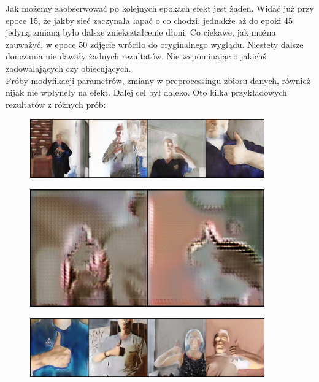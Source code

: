 \documentclass[12pt]{article}
\begin{document}
\begin{sloppypar}
{{\begin{figure}
    \end{figure}
    Jak możemy zaobserwować po kolejnych epokach efekt jest żaden. 
    Widać już przy epoce 15, że jakby sieć zaczynała łapać o co chodzi, jednakże aż do epoki 45 jedyną zmianą było dalsze zniekształcenie dłoni. 
    Co ciekawe, jak można zauważyć, w epoce 50 zdjęcie wróciło do oryginalnego wyglądu. 
    Niestety dalsze douczania nie dawały żadnych rezultatów. Nie wspominając o jakichś zadowalających czy obiecujących. \\
    Próby modyfikacji parametrów, zmiany w preprocessingu zbioru danych, również nijak nie wpłyneły na efekt. Dalej cel był daleko. 
    Oto kilka przykładowych rezultatów z różnych prób:
    \begin{figure}[H]
      \centering
      \includegraphics[width=0.9\textwidth]{cycle-gan/random/3eba8ca0-dc5f-4021-9dd5-3105e3f6f3c4.jpg}
    \end{figure}
    \begin{figure}[H]
      \centering
      \includegraphics[width=0.9\textwidth]{cycle-gan/random/385d1e83-effb-44aa-aae0-791c4d7501da.jpg}
    \end{figure}
    \begin{figure}[H]
      \centering
      \includegraphics[width=0.9\textwidth]{cycle-gan/random/91b77fa0-174d-464e-9cef-2c76388613eb.jpg}

\end{figure}}}
\end{sloppypar}
\end{document}
